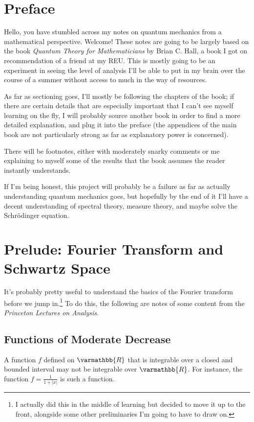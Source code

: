 \documentclass[12pt]{extarticle}
\title{}
\author{}
\date{}
\newcommand{\R}{\varmathbb{R}}
\theoremstyle{plain}
\theoremstyle{definition}
\theoremstyle{remark}
\renewcommand{\newline}{\hfill\break}
\begin{document}
\tableofcontents
\pagebreak
  \section{Preface}%
  Hello, you have stumbled across my notes on quantum mechanics from a mathematical perspective. Welcome! These notes are going to be largely based on the book \textit{Quantum Theory for Mathematicians} by Brian C. Hall, a book I got on recommendation of a friend at my REU. This is mostly going to be an experiment in seeing the level of analysis I'll be able to put in my brain over the course of a summer without access to much in the way of resources.\newline

  As far as sectioning goes, I'll mostly be following the chapters of the book; if there are certain details that are especially important that I can't see myself learning on the fly, I will probably source another book in order to find a more detailed explanation, and plug it into the preface (the appendices of the main book are not particularly strong as far as explanatory power is concerned).\newline

  There will be footnotes, either with moderately snarky comments or me explaining to myself some of the results that the book assumes the reader instantly understands.\newline

  If I'm being honest, this project will probably be a failure as far as actually understanding quantum mechanics goes, but hopefully by the end of it I'll have a decent understanding of spectral theory, measure theory, and maybe solve the Schrödinger equation.
  \pagebreak
  \section{Prelude: Fourier Transform and Schwartz Space}%
  It's probably pretty useful to understand the basics of the Fourier transform before we jump in.\footnote{I actually did this in the middle of learning but decided to move it up to the front, alongside some other preliminaries I'm going to have to draw on.} To do this, the following are notes of some content from the \textit{Princeton Lectures on Analysis}. 
  \subsection{Functions of Moderate Decrease}%
  A function $f$ defined on $\R$ that is integrable over a closed and bounded interval may not be integrable over $\R$. For instance, the function $f = \frac{1}{1+|x|}$ is such a function.\newline
\end{document}
